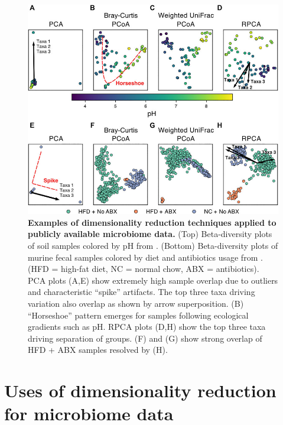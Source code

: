 \begin{figure}[htbp]
\centering
\includegraphics[width=\textwidth]{review-figures/figure02.jpeg}
\caption[Examples of dimensionality reduction techniques applied to publicly available microbiome data]{\textbf{Examples of dimensionality reduction techniques applied to publicly available microbiome data.} (Top) Beta-diversity plots of soil samples colored by pH from \cite{Lauber2009-jo}. (Bottom) Beta-diversity plots of murine fecal samples colored by diet and antibiotics usage from \cite{Shalapour2017-iv}. (HFD = high-fat diet, NC = normal chow, ABX = antibiotics). PCA plots (A,E) show extremely high sample overlap due to outliers and characteristic “spike” artifacts. The top three taxa driving variation also overlap as shown by arrow superposition. (B) “Horseshoe” pattern emerges for samples following ecological gradients such as pH. RPCA plots (D,H) show the top three taxa driving separation of groups. (F) and (G) show strong overlap of HFD + ABX samples resolved by (H).}
\label{review_fig2}
\end{figure}

\section{Uses of dimensionality reduction for microbiome data}

